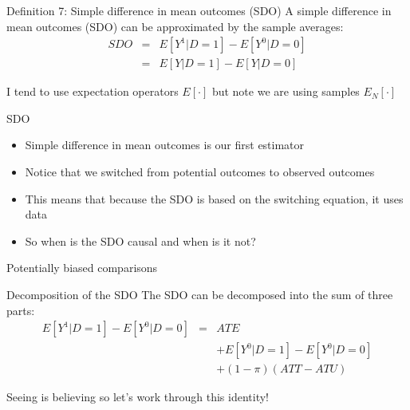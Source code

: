 \documentclass{beamer}
\begin{document}
\begin{frame}[plain]


  \begin{block}{Definition 7: Simple difference in mean outcomes (SDO)}
    A simple difference in mean outcomes (SDO) can be approximated by the sample averages:\begin{eqnarray*}
      SDO &=& E[Y^1 | D=1] - E[Y^0 | D=0] \\
      &=& E[Y | D=1] - E[Y | D=0]
    \end{eqnarray*}
  \end{block}
  \bigskip
  I tend to use expectation operators $E[ \cdot ]$ but note we are using samples $E_N[ \cdot ]$

\end{frame}

\begin{frame}{SDO}

  \begin{itemize}
    \item Simple difference in mean outcomes is our first estimator
    \item Notice that we switched from potential outcomes to observed outcomes
    \item This means that because the SDO is based on the switching equation, it uses data
    \item So when is the SDO causal and when is it not?
  \end{itemize}

\end{frame}


\begin{frame}{Potentially biased comparisons}

  \begin{block}{Decomposition of the SDO}
    The SDO can be decomposed into the sum of three parts:
    \begin{eqnarray*}
      E[Y^1 | D=1] - E[Y^0 | D=0]&=& ATE\nonumber \\
      &&+ E[Y^0|D=1] - E[Y^0|D=0] \nonumber \\
      && + (1-\pi)(ATT - ATU)
    \end{eqnarray*}
  \end{block}
  Seeing is believing so let's work through this identity!

\end{frame}
\end{document}
